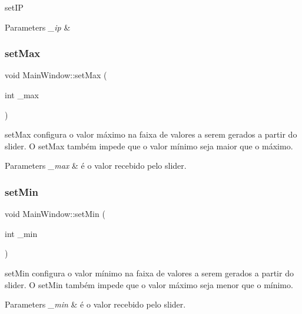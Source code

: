 set\+IP 


\begin{DoxyParams}{Parameters}
{\em \+\_\+ip} & \\
\hline
\end{DoxyParams}
\mbox{\label{class_main_window_ad8a004156f79731b347b744e473006ba}} 
\subsubsection{\texorpdfstring{set\+Max}{setMax}}
{\footnotesize\ttfamily void Main\+Window\+::set\+Max (\begin{DoxyParamCaption}\item[{int}]{\+\_\+max }\end{DoxyParamCaption})\hspace{0.3cm}{\ttfamily [slot]}}



set\+Max configura o valor máximo na faixa de valores a serem gerados a partir do slider. O set\+Max também impede que o valor mínimo seja maior que o máximo. 


\begin{DoxyParams}{Parameters}
{\em \+\_\+max} & é o valor recebido pelo slider. \\
\hline
\end{DoxyParams}
\mbox{\label{class_main_window_a32f19952203e037e8022343c290b596f}} 
\subsubsection{\texorpdfstring{set\+Min}{setMin}}
{\footnotesize\ttfamily void Main\+Window\+::set\+Min (\begin{DoxyParamCaption}\item[{int}]{\+\_\+min }\end{DoxyParamCaption})\hspace{0.3cm}{\ttfamily [slot]}}



set\+Min configura o valor mínimo na faixa de valores a serem gerados a partir do slider. O set\+Min também impede que o valor máximo seja menor que o mínimo. 


\begin{DoxyParams}{Parameters}
{\em \+\_\+min} & é o valor recebido pelo slider. \\
\hline
\end{DoxyParams}
\mbox{\label{class_main_window_ab5db2dcd9b9592285a18fa7d19256e6a}} 
